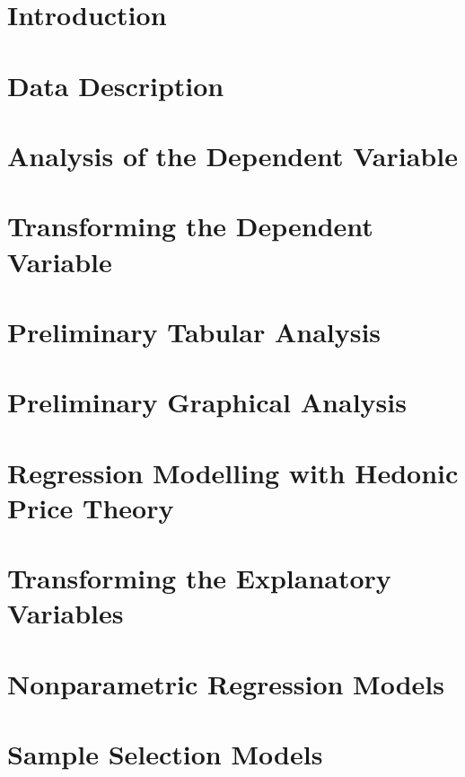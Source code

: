 \documentclass[11pt]{book}
\begin{document}



\pagebreak
\chapter{Introduction}


\pagebreak
\chapter{Data Description}


\pagebreak
\chapter{Analysis of the Dependent Variable}


\pagebreak
\chapter{Transforming the Dependent Variable}


\pagebreak
\chapter{Preliminary Tabular Analysis}


\pagebreak
\chapter{Preliminary Graphical Analysis}


\pagebreak
\chapter{Regression Modelling with Hedonic Price Theory}


\pagebreak
\chapter{Transforming the Explanatory Variables}


\pagebreak
\chapter{Nonparametric Regression Models}


\pagebreak
\chapter{Sample Selection Models}


% 


\end{document}
